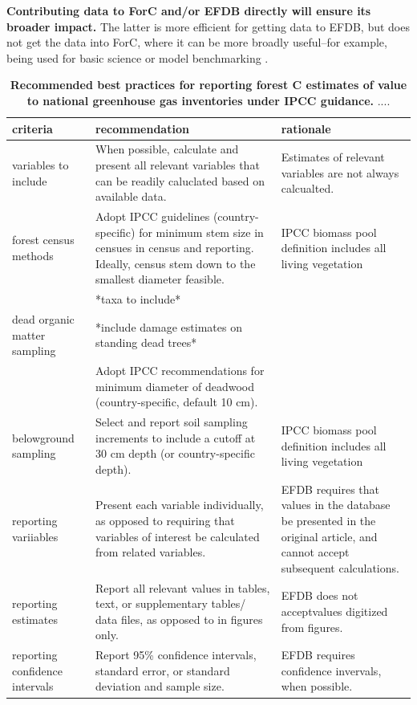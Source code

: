 \documentclass[, manuscript]{copernicus}
\begin{document}
\textbf{Contributing data to ForC and/or EFDB directly will ensure its
broader impact.} The latter is more efficient for getting data to EFDB,
but does not get the data into ForC, where it can be more broadly
useful--for example, being used for basic science
\citep[e.g.,][]{banburymorgan_global_2021, anderson-teixeira_carbon_2021}
or model benchmarking \citep{fer_ecosystem_2021}.

\begin{table}

\caption{\label{tab:table_recommendations}\textbf{Recommended best practices for reporting forest C estimates of value to national greenhouse gas inventories under IPCC guidance. } ....}
\centering
\begin{tabu} to 
\hline
\textbf{criteria} & \textbf{recommendation} & \textbf{rationale}\\
\hline
variables to include & When possible, calculate and present all relevant variables that can be readily caluclated based on available data. & Estimates of relevant variables are not always calcualted.\\
\hline
forest census methods & Adopt IPCC guidelines (country-specific) for minimum stem size in censues in census and reporting. Ideally, census stem down to the smallest diameter feasible. & IPCC biomass pool definition includes all living vegetation\\
\hline
 & *taxa to include* & \\
\hline
dead organic matter sampling & *include damage estimates on standing dead trees* & \\
\hline
 & Adopt IPCC recommendations for minimum diameter of deadwood (country-specific, default 10 cm). & \\
\hline
belowground sampling & Select and report soil sampling increments to include a cutoff at 30 cm depth (or country-specific depth). & IPCC biomass pool definition includes all living vegetation\\
\hline
reporting variiables & Present each variable individually, as opposed to requiring that variables of interest be calculated from related variables. & EFDB requires that values in the database be presented in the original article, and cannot accept subsequent calculations.\\
\hline
reporting estimates & Report all relevant values in tables, text, or supplementary tables/ data files, as opposed to in figures only. & EFDB does not acceptvalues digitized from figures.\\
\hline
reporting confidence intervals & Report 95\% confidence intervals, standard error, or standard deviation and sample size. & EFDB requires confidence invervals, when possible.\\
\hline
\end{tabu}
\end{table}
\end{document}
